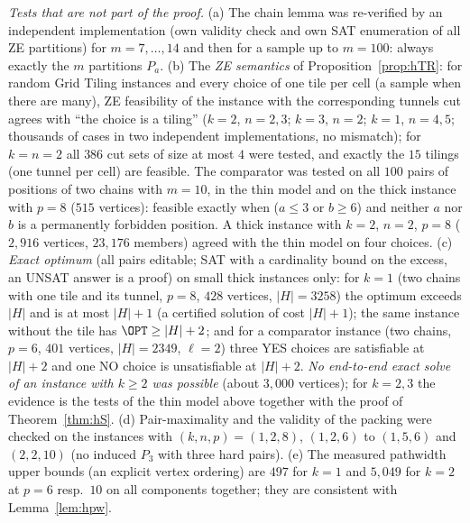 \emph{Tests that are not part of the proof.} (a) The chain lemma was re-verified by an independent implementation (own validity check and own SAT enumeration of all ZE partitions) for $m=7,\dots,14$ and then for a sample up to $m=100$: always exactly the $m$ partitions $P_a$. (b) The \emph{ZE semantics} of Proposition~\ref{prop:hTR}: for random Grid Tiling instances and every choice of one tile per cell (a sample when there are many), ZE feasibility of the instance with the corresponding tunnels cut agrees with ``the choice is a tiling'' ($k=2$, $n=2,3$; $k=3$, $n=2$; $k=1$, $n=4,5$; thousands of cases in two independent implementations, no mismatch); for $k=n=2$ all $386$ cut sets of size at most $4$ were tested, and exactly the $15$ tilings (one tunnel per cell) are feasible. The comparator was tested on all $100$ pairs of positions of two chains with $m=10$, in the thin model and on the thick instance with $p=8$ ($515$ vertices): feasible exactly when ($a\le3$ or $b\ge6$) and neither $a$ nor $b$ is a permanently forbidden position. A thick instance with $k=2$, $n=2$, $p=8$ ($2{,}916$ vertices, $23{,}176$ members) agreed with the thin model on four choices. (c) \emph{Exact optimum} (all pairs editable; SAT with a cardinality bound on the excess, an UNSAT answer is a proof) on small thick instances only: for $k=1$ (two chains with one tile and its tunnel, $p=8$, $428$ vertices, $|H|=3258$) the optimum exceeds $|H|$ and is at most $|H|+1$ (a certified solution of cost $|H|+1$); the same instance without the tile has $\OPT\ge|H|+2$; and for a comparator instance (two chains, $p=6$, $401$ vertices, $|H|=2349$, $\ell=2$) three YES choices are satisfiable at $|H|+2$ and one NO choice is unsatisfiable at $|H|+2$. \emph{No end-to-end exact solve of an instance with $k\ge2$ was possible} (about $3{,}000$ vertices); for $k=2,3$ the evidence is the tests of the thin model above together with the proof of Theorem~\ref{thm:hS}. (d) Pair-maximality and the validity of the packing were checked on the instances with $(k,n,p)=(1,2,8)$, $(1,2,6)$ to $(1,5,6)$ and $(2,2,10)$ (no induced $P_3$ with three hard pairs). (e) The measured pathwidth upper bounds (an explicit vertex ordering) are $497$ for $k=1$ and $5{,}049$ for $k=2$ at $p=6$ resp.\ $10$ on all components together; they are consistent with Lemma~\ref{lem:hpw}.


